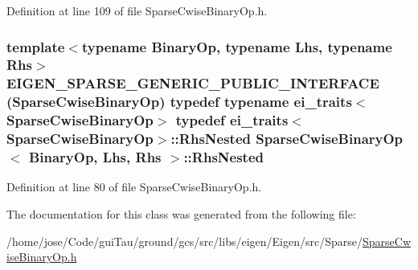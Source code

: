 Definition at line 109 of file Sparse\-Cwise\-Binary\-Op.\-h.

\hypertarget{class_sparse_cwise_binary_op_ad4e1071aee8d4d88215fe279cf510d84}{
\subsubsection[{Rhs\-Nested}]{\setlength{\rightskip}{0pt plus 5cm}template$<$typename Binary\-Op, typename Lhs, typename Rhs$>$ E\-I\-G\-E\-N\-\_\-\-S\-P\-A\-R\-S\-E\-\_\-\-G\-E\-N\-E\-R\-I\-C\-\_\-\-P\-U\-B\-L\-I\-C\-\_\-\-I\-N\-T\-E\-R\-F\-A\-C\-E ({\bf Sparse\-Cwise\-Binary\-Op}) typedef typename {\bf ei\-\_\-traits}$<${\bf Sparse\-Cwise\-Binary\-Op}$>$ typedef {\bf ei\-\_\-traits}$<${\bf Sparse\-Cwise\-Binary\-Op}$>$\-::Rhs\-Nested {\bf Sparse\-Cwise\-Binary\-Op}$<$ Binary\-Op, Lhs, Rhs $>$\-::Rhs\-Nested}}\label{class_sparse_cwise_binary_op_ad4e1071aee8d4d88215fe279cf510d84}


Definition at line 80 of file Sparse\-Cwise\-Binary\-Op.\-h.



The documentation for this class was generated from the following file\-:\begin{DoxyCompactItemize}
\item 
/home/jose/\-Code/gui\-Tau/ground/gcs/src/libs/eigen/\-Eigen/src/\-Sparse/\hyperlink{_sparse_cwise_binary_op_8h}{Sparse\-Cwise\-Binary\-Op.\-h}\end{DoxyCompactItemize}
